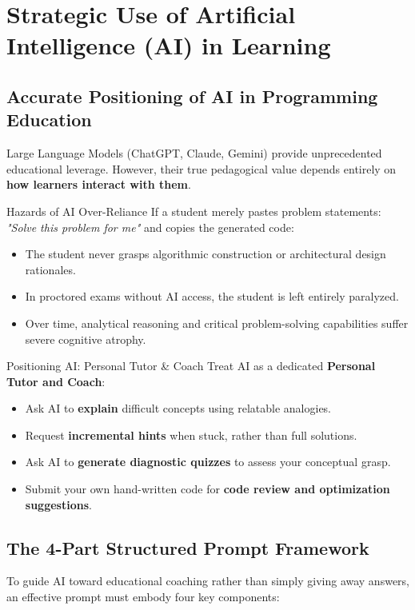 \documentclass[11pt,a4paper]{article}
\begin{document}
\newpage
\section{Strategic Use of Artificial Intelligence (AI) in Learning}

\subsection{Accurate Positioning of AI in Programming Education}
Large Language Models (ChatGPT, Claude, Gemini) provide unprecedented educational leverage. However, their true pedagogical value depends entirely on \textbf{how learners interact with them}.

\begin{warningbox}{Hazards of AI Over-Reliance}
If a student merely pastes problem statements: \textit{"Solve this problem for me"} and copies the generated code:
\begin{itemize}[leftmargin=1.5em, itemsep=2pt]
    \item The student never grasps algorithmic construction or architectural design rationales.
    \item In proctored exams without AI access, the student is left entirely paralyzed.
    \item Over time, analytical reasoning and critical problem-solving capabilities suffer severe cognitive atrophy.
\end{itemize}
\end{warningbox}

\begin{tipbox}{Positioning AI: Personal Tutor \& Coach}
Treat AI as a dedicated \textbf{Personal Tutor and Coach}:
\begin{itemize}[leftmargin=1.5em, itemsep=2pt]
    \item Ask AI to \textbf{explain} difficult concepts using relatable analogies.
    \item Request \textbf{incremental hints} when stuck, rather than full solutions.
    \item Ask AI to \textbf{generate diagnostic quizzes} to assess your conceptual grasp.
    \item Submit your own hand-written code for \textbf{code review and optimization suggestions}.
\end{itemize}
\end{tipbox}

\subsection{The 4-Part Structured Prompt Framework}
To guide AI toward educational coaching rather than simply giving away answers, an effective prompt must embody four key components:
\end{document}
